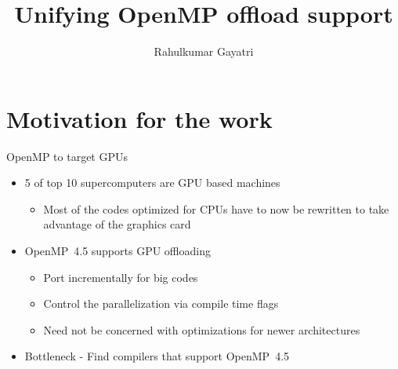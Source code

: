 \documentclass[xcolor=dvipsnames,compress,10pt]{nersc}
\title[Short Title]{Unifying OpenMP offload support}
\subtitle{}
\author[Rahul Gayatri]{\Large Rahulkumar Gayatri}
\begin{document}
%
\begin{frame}[label=title,plain]
    \maketitle
{}
\end{frame}

\section{Motivation for the work}
\begin{frame}{OpenMP to target GPUs}
\begin{itemize}
    \setlength\itemsep{1.2em}
    \item 5 of top 10 supercomputers are GPU based machines
    \begin{itemize}
        \item Most of the codes optimized for CPUs have to now
            be rewritten to take advantage of the graphics card
    \end{itemize}
    \item OpenMP~4.5 supports GPU offloading
    \begin{itemize}
        \item Port incrementally for big codes
        \item Control the parallelization via compile time flags
        \item Need not be concerned with optimizations for newer architectures
    \end{itemize}
    \item Bottleneck - Find compilers that support OpenMP~4.5
\end{itemize}
\end{frame}

\end{document}
